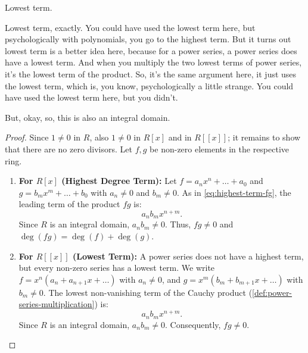 \begin{student}
Lowest term.
\end{student}

\begin{speech}[00:06:41 - 00:07:07]
Lowest term, exactly. You could have used the lowest term here, but psychologically with polynomials, you go to the highest term. But it turns out lowest term is a better idea here, because for a power series, a power series does have a lowest term. And when you multiply the two lowest terms of power series, it's the lowest term of the product. So, it's the same argument here, it just uses the lowest term, which is, you know, psychologically a little strange. You could have used the lowest term here, but you didn't. 

But, okay, so, this is also an integral domain.
\end{speech}

\begin{content}

\begin{proof}
Since $1 \neq 0$ in $R$, also $1 \neq 0$ in $R[x]$ and in $R[[x]]$; it remains to show that there are no zero divisors. Let $f, g$ be non-zero elements in the respective ring.
\begin{enumerate}[label=\textbf{(\arabic*)}]
    \item \textbf{For $R[x]$ (Highest Degree Term):}
    Let $f = a_n x^n + \dots + a_0$ and $g = b_m x^m + \dots + b_0$ with $a_n \neq 0$ and $b_m \neq 0$. As in \eqref{eq:highest-term-fg}, the leading term of the product $f g$ is:
    \[
    a_n b_m x^{n+m}.
    \]
    Since $R$ is an integral domain, $a_n b_m \neq 0$. Thus, $f g \neq 0$ and $\deg(f g) = \deg(f) + \deg(g)$.
    \item \textbf{For $R[[x]]$ (Lowest Term):}
    A power series does not have a highest term, but every non-zero series has a lowest term. We write $f = x^n (a_n + a_{n+1} x + \dots)$ with $a_n \neq 0$, and $g = x^m (b_m + b_{m+1} x + \dots)$ with $b_m \neq 0$. The lowest non-vanishing term of the Cauchy product (\cref{def:power-series-multiplication}) is:
    \[
    a_n b_m x^{n+m}.
    \]
    Since $R$ is an integral domain, $a_n b_m \neq 0$. Consequently, $f g \neq 0$.
\end{enumerate}
\end{proof}
\end{content}

